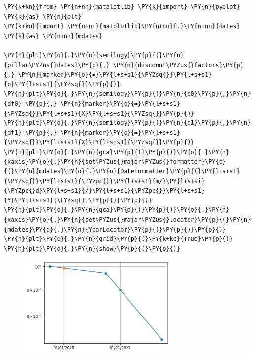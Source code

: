 \begin{tcolorbox}[breakable, size=fbox, boxrule=1pt, pad at break*=1mm,colback=cellbackground, colframe=cellborder]
\begin{Verbatim}[commandchars=\\\{\}]
\PY{k+kn}{from} \PY{n+nn}{matplotlib} \PY{k}{import} \PY{n}{pyplot} \PY{k}{as} \PY{n}{plt}
\PY{k+kn}{import} \PY{n+nn}{matplotlib}\PY{n+nn}{.}\PY{n+nn}{dates} \PY{k}{as} \PY{n+nn}{mdates}

\PY{n}{plt}\PY{o}{.}\PY{n}{semilogy}\PY{p}{(}\PY{n}{pillar\PYZus{}dates}\PY{p}{,} \PY{n}{discount\PYZus{}factors}\PY{p}{,} \PY{n}{marker}\PY{o}{=}\PY{l+s+s1}{\PYZsq{}}\PY{l+s+s1}{o}\PY{l+s+s1}{\PYZsq{}}\PY{p}{)}
\PY{n}{plt}\PY{o}{.}\PY{n}{semilogy}\PY{p}{(}\PY{n}{d0}\PY{p}{,}\PY{n}{df0} \PY{p}{,} \PY{n}{marker}\PY{o}{=}\PY{l+s+s1}{\PYZsq{}}\PY{l+s+s1}{X}\PY{l+s+s1}{\PYZsq{}}\PY{p}{)}
\PY{n}{plt}\PY{o}{.}\PY{n}{semilogy}\PY{p}{(}\PY{n}{d1}\PY{p}{,}\PY{n}{df1} \PY{p}{,} \PY{n}{marker}\PY{o}{=}\PY{l+s+s1}{\PYZsq{}}\PY{l+s+s1}{X}\PY{l+s+s1}{\PYZsq{}}\PY{p}{)}
\PY{n}{plt}\PY{o}{.}\PY{n}{gca}\PY{p}{(}\PY{p}{)}\PY{o}{.}\PY{n}{xaxis}\PY{o}{.}\PY{n}{set\PYZus{}major\PYZus{}formatter}\PY{p}{(}\PY{n}{mdates}\PY{o}{.}\PY{n}{DateFormatter}\PY{p}{(}\PY{l+s+s1}{\PYZsq{}}\PY{l+s+s1}{\PYZpc{}}\PY{l+s+s1}{m/}\PY{l+s+si}{\PYZpc{}d}\PY{l+s+s1}{/}\PY{l+s+s1}{\PYZpc{}}\PY{l+s+s1}{Y}\PY{l+s+s1}{\PYZsq{}}\PY{p}{)}\PY{p}{)}
\PY{n}{plt}\PY{o}{.}\PY{n}{gca}\PY{p}{(}\PY{p}{)}\PY{o}{.}\PY{n}{xaxis}\PY{o}{.}\PY{n}{set\PYZus{}major\PYZus{}locator}\PY{p}{(}\PY{n}{mdates}\PY{o}{.}\PY{n}{YearLocator}\PY{p}{(}\PY{p}{)}\PY{p}{)}
\PY{n}{plt}\PY{o}{.}\PY{n}{grid}\PY{p}{(}\PY{k+kc}{True}\PY{p}{)}
\PY{n}{plt}\PY{o}{.}\PY{n}{show}\PY{p}{(}\PY{p}{)}
\end{Verbatim}
\end{tcolorbox}
\vfill
\begin{figure}[h]
  \centering
  \includegraphics[width=0.7\textwidth]{lecture_3_15_0.png}
\end{figure}

